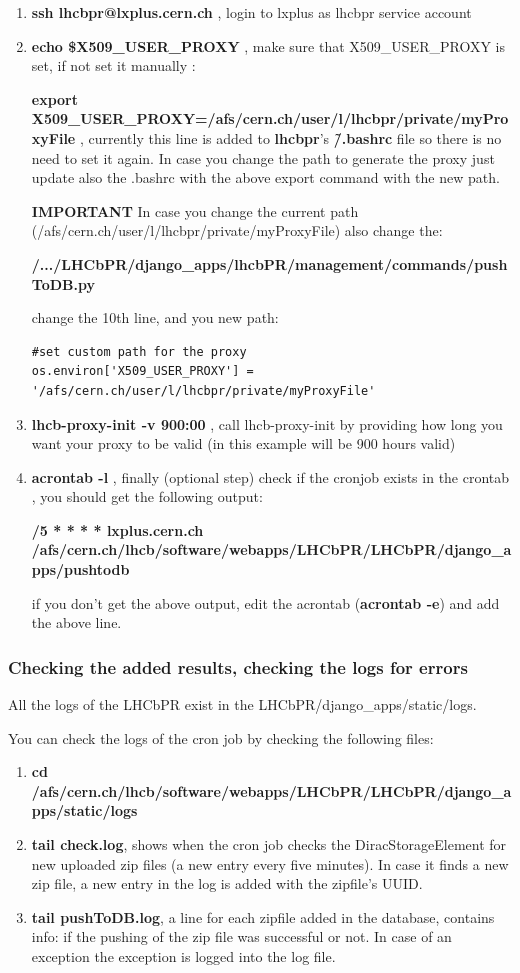 \documentclass{lhcbnote}
\begin{document}
\vspace {2mm}
\begin {enumerate}
\item
{\bf ssh lhcbpr@lxplus.cern.ch} , login to lxplus as lhcbpr service account
\item
{\bf echo \$X509\_USER\_PROXY} , make sure that X509\_USER\_PROXY is set, if not set it manually :

{\bf export X509\_USER\_PROXY=/afs/cern.ch/user/l/lhcbpr/private/myProxyFile} , currently this line is added to {\bf lhcbpr}'s {\bf \~/.bashrc} file so there is no need to set it again. 
In case you change the path to generate the proxy just update also the .bashrc with the above export command with the new path. 

{\bf IMPORTANT} In case you change the current path (/afs/cern.ch/user/l/lhcbpr/private/myProxyFile) also change the:

{\bf /.../LHCbPR/django\_apps/lhcbPR/management/commands/pushToDB.py}

change the 10th line, and you new path:
\begin{verbatim}
#set custom path for the proxy
os.environ['X509_USER_PROXY'] = '/afs/cern.ch/user/l/lhcbpr/private/myProxyFile'
\end{verbatim}

\item
{\bf lhcb-proxy-init -v 900:00} , call lhcb-proxy-init by providing how long you want your proxy to be valid (in this example will be 900 hours valid)
\item
{\bf acrontab -l} , finally (optional step) check if the cronjob exists in the crontab , you should get the following output:

{\bf */5 * * * * lxplus.cern.ch /afs/cern.ch/lhcb/software/webapps/LHCbPR/LHCbPR/django\_apps/pushtodb}

if you don't get the above output, edit the acrontab ({\bf acrontab -e}) and add the above line.
\end {enumerate}

\subsubsection{Checking the added results, checking the logs for errors}
All the logs of the LHCbPR exist in the LHCbPR/django\_apps/static/logs.

You can check the logs of the cron job by checking the following files:

\begin{enumerate}
\item
{\bf cd /afs/cern.ch/lhcb/software/webapps/LHCbPR/LHCbPR/django\_apps/static/logs}
\item
{\bf tail check.log}, shows when the cron job checks the DiracStorageElement for new uploaded zip files (a new entry every five minutes). In case it finds a 
new zip file, a new entry in the log is added with the zipfile's UUID.
\item 
{\bf tail pushToDB.log}, a line for each zipfile added in the database, contains info: if the pushing of the zip file was successful or not. In 
case of an exception the exception is logged into the log file. 
\end{enumerate}
\end{document}
